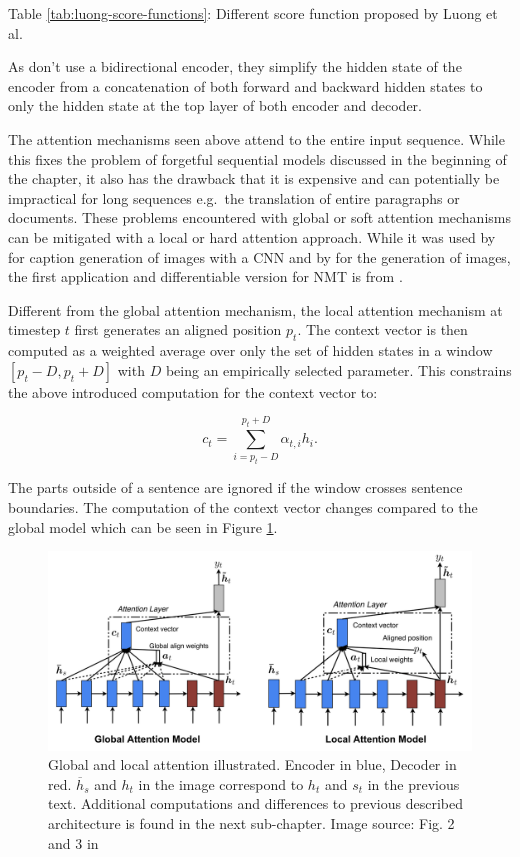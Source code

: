 \documentclass[]{krantz}
\begin{document}
Table \ref{tab:luong-score-functions}: \label{tab:luong-score-functions} Different score function proposed by Luong et al.

As \citet{luong2015effective} don't use a bidirectional encoder, they simplify the hidden
state of the encoder from a concatenation of both forward and backward hidden states
to only the hidden state at the top layer of both encoder and decoder.

The attention mechanisms seen above attend to the entire input sequence. While
this fixes the problem of forgetful sequential models discussed in the beginning of the chapter,
it also has the drawback that it is expensive and can potentially be impractical
for long sequences e.g.~the translation of entire paragraphs or documents. These problems encountered
with global or soft attention mechanisms can be mitigated with a local or hard attention
approach. While it was used by \citet{xu2015show} for caption generation of images with a CNN
and by \citet{gregor2015draw} for the generation of images, the first application and differentiable version for NMT
is from \citet{luong2015effective}.

Different from the global attention mechanism, the local
attention mechanism at timestep \(t\) first generates an aligned position \(p_t\).
The context vector is then computed as a weighted average over only the set of
hidden states in a window \([p_t-D,p_t+D]\) with \(D\) being an empirically selected
parameter. This constrains the above introduced computation for the context vector
to:

\[
c_t = \sum^{p_t+D}_{i=p_t-D}\alpha_{t,i}h_i.
\]

The parts outside of a sentence are ignored if the window crosses sentence
boundaries. The computation of the context vector changes compared to
the global model which can be seen in Figure \ref{fig:attention-plots-luong}.

\begin{figure}

{\centering \includegraphics[width=1\linewidth]{figures/02-02-attention-and-self-attention-for-nlp/luong2015-fig2-3} 

}

\caption{Global and local attention illustrated. Encoder in blue, Decoder in red. \(\overline{h}_s\) and $h_t$ in the image correspond to $h_t$ and $s_t$ in the previous text. Additional computations and differences to previous described architecture is found in the next sub-chapter. Image source: Fig. 2 and 3 in \citep{luong2015effective}}\label{fig:attention-plots-luong}
\end{figure}
\end{document}

